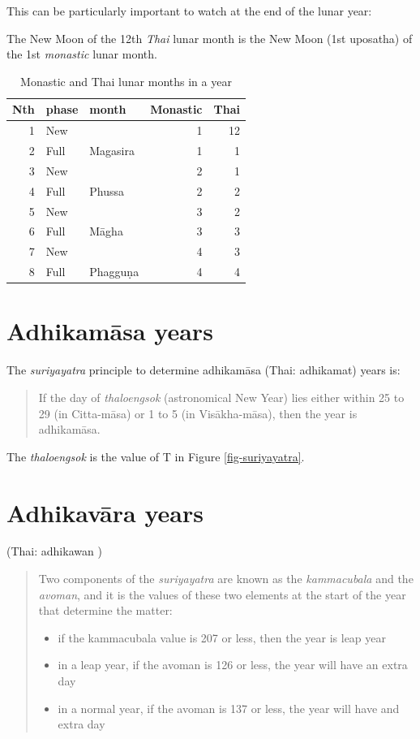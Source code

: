 \documentclass[11pt,oneside]{memoir-article}
\begin{document}
This can be particularly important to watch at the end of the lunar year:

The New Moon of the 12th \emph{Thai} lunar month is the New Moon (1st uposatha) of
the 1st \emph{monastic} lunar month.

\begin{table}[h]
\caption{\label{monastic-thai-year} Monastic and Thai lunar months in a year}
\centering
\begin{tabular}{rllrr}
Nth & phase & month & Monastic & Thai\\
\hline
1 & New &  & 1 & 12\\
2 & Full & Magasira & 1 & 1\\
3 & New &  & 2 & 1\\
4 & Full & Phussa & 2 & 2\\
5 & New &  & 3 & 2\\
6 & Full & Māgha & 3 & 3\\
7 & New &  & 4 & 3\\
8 & Full & Phagguṇa & 4 & 4\\
\end{tabular}
\end{table}

\section{Adhikamāsa years}
\label{sec-3-3}
\label{adhikamasa-years}

The \emph{suriyayatra} principle to determine adhikamāsa (Thai: adhikamat) years is:

\begin{quote}
If the day of \emph{thaloengsok} (astronomical New Year)
lies either within 25 to 29 (in Citta-māsa) or 1 to 5 (in
Visākha-māsa), then the year is adhikamāsa.\cite{prasert-ngan}
\end{quote}

The \emph{thaloengsok} is the value of T in Figure \ref{fig-suriyayatra}.

\section{Adhikavāra years}
\label{sec-3-4}
\label{adhikavara-years}

(Thai: adhikawan )

\begin{quote}
Two components of the \emph{suriyayatra} are known as the \emph{kammacubala} and
the \emph{avoman}, and it is the values of these two elements at the start
of the year that determine the matter:

\begin{itemize}
\item if the kammacubala value is 207 or less, then the year is leap year
\item in a leap year, if the avoman is 126 or less, the year will have an
extra day
\item in a normal year, if the avoman is 137 or less, the year will have
and extra day\cite{eade-interpolation}
\end{itemize}
\end{quote}
\end{document}
